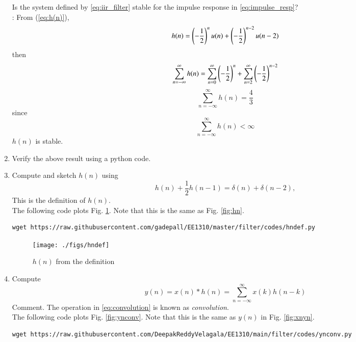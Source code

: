 \documentclass[journal,12pt,twocolumn]{IEEEtran}
\renewcommand\thesection{\arabic{section}}
\begin{document}
\begin{enumerate}[label=\thesection.\arabic*]
Is the system defined by \eqref{eq:iir_filter} stable for the impulse response in \eqref{eq:impulse_resp}?
%
\\
\solution: From (\ref{eq:h(n)}),
\begin{equation}
    h(n) = \left(-\frac{1}{2}\right)^{n}u(n) + \left(-\frac{1}{2}\right)^{n-2}u(n-2) 
\end{equation}
then 
\begin{equation}
    \sum_{n=-\infty}^{\infty}h(n) = \sum_{n=0}^{\infty} \left(-\frac{1}{2}\right)^{n} + \sum_{n=2}^{\infty} \left(-\frac{1}{2}\right)^{n-2}
\end{equation}
\begin{equation}
    \sum_{n=-\infty}^{\infty}h(n) = \frac{4}{3}
\end{equation}
since 
\begin{equation}
    \sum_{n=-\infty}^{\infty}h(n) < \infty
\end{equation}
$h(n)$ is stable.
\item Verify the above result using a python code.
\item 
Compute and sketch $h(n)$ using 
\begin{equation}
\label{eq:iir_filter_h}
h(n) + \frac{1}{2}h(n-1) = \delta(n) + \delta(n-2), 
\end{equation}
%
This is the definition of $h(n)$.
\\
\solution The following code plots Fig. \ref{fig:hndef}. Note that this is the same as Fig. 
\ref{fig:hn}. 
%
\begin{lstlisting}
wget https://raw.githubusercontent.com/gadepall/EE1310/master/filter/codes/hndef.py
\end{lstlisting}
\begin{figure}[!ht]
\centering
\texttt{[image: ./figs/hndef]}
\caption{$h(n)$ from the definition}
\label{fig:hndef}
\end{figure}
%
\item Compute 
%
\begin{equation}
\label{eq:convolution}
y(n) = x(n)*h(n) = \sum_{n=-\infty}^{\infty}x(k)h(n-k)
\end{equation}
%
Comment. The operation in \eqref{eq:convolution} is known as
{\em convolution}.
%
\\
\solution The following code plots Fig. \ref{fig:ynconv}. Note that this is the same as 
$y(n)$ in  Fig. 
\ref{fig:xnyn}. 
%
\begin{lstlisting}
wget https://raw.githubusercontent.com/DeepakReddyVelagala/EE1310/main/filter/codes/ynconv.py
\end{lstlisting}

\end{enumerate}
\end{document}
